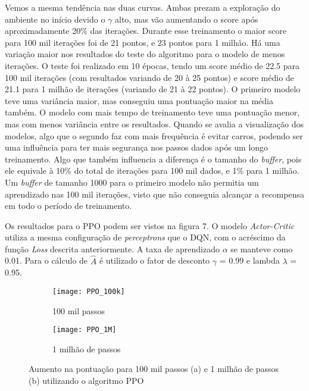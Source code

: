 \documentclass[letterpaper]{article} %
\begin{document}
Vemos a mesma tendência nas duas curvas. Ambas prezam a exploração do ambiente no início devido o $\gamma$ alto, mas vão aumentando o score após aproximadamente 20\% das iterações. Durante esse treinamento o maior score para 100 mil iterações foi de 21 pontos, e 23 pontos para 1 milhão. Há uma variação maior nos resultados do teste do algoritmo para o modelo de menos iterações. O teste foi realizado em 10 épocas, tendo um score médio de 22.5 para 100 mil iterações (com resultados variando de 20 à 25 pontos) e score médio de 21.1 para 1 milhão de iterações (variando de 21 à 22 pontos). O primeiro modelo teve uma variância maior, mas conseguiu uma pontuação maior na média também. O modelo com mais tempo de treinamento teve uma pontuação menor, mas com menos variância entre os resultados. Quando se avalia a visualização dos modelos, algo que o segundo faz com mais frequência é evitar carros, podendo ser uma influência para ter mais segurança nos passos dados após um longo treinamento. Algo que também influencia a diferença é o tamanho do \textit{buffer}, pois ele equivale à 10\% do total de iterações para 100 mil dados, e 1\% para 1 milhão. Um \textit{buffer} de tamanho 1000 para o primeiro modelo não permitia um aprendizado nas 100 mil iterações, visto que não conseguia alcançar a recompensa em todo o período de treinamento.


Os resultados para o PPO podem ser vistos na figura 7. O modelo \textit{Actor-Critic} utiliza a mesma configuração de \textit{perceptrons} que o DQN, com o acréscimo da função \textit{Loss} descrita anteriormente. A taxa de aprendizado $\alpha$ se manteve como 0.01. Para o cálculo de $\hat{A}$ é utilizado o fator de desconto $\gamma$ = 0.99 e lambda $\lambda$ = 0.95.

\begin{center}
\begin{figure}[h]
     \begin{subfigure}[h]{0.37\textwidth}
	     \hspace{0.8cm}
         \texttt{[image: PPO\_100k]}
         \caption{100 mil passos}
     \end{subfigure}
     \hfill
     \begin{subfigure}[h]{0.37\textwidth}
         \hspace{0.8cm}
		 \texttt{[image: PPO\_1M]}
         \caption{1 milhão de passos}
     \end{subfigure}
        \caption{Aumento na pontuação para 100 mil passos (a) e 1 milhão de passos (b) utilizando o algoritmo PPO}
\end{figure}
\end{center}
\end{document}
